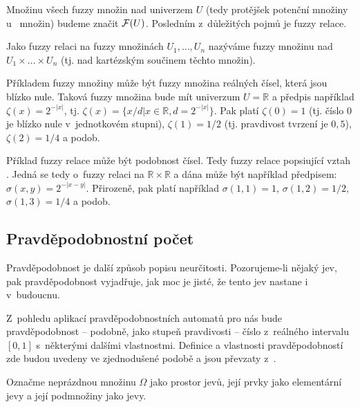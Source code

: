 Množinu všech fuzzy množin nad univerzem $U$ (tedy protějšek potenční množiny u~ množin) budeme značit $\mathcal{F}(U)$. Posledním z~důležitých pojmů je fuzzy relace.

\begin{definition}
 Jako fuzzy relaci na fuzzy množinách $U_1, \dots, U_n$ nazýváme fuzzy množinu nad $U_1 \times \dots \times U_n$ (tj. nad kartézským součinem těchto množin).
\end{definition}

\begin{example}
  Příkladem fuzzy množiny může být fuzzy množina reálných čísel, která jsou blízko nule. Taková fuzzy množina bude mít univerzum $U = \mathbb{R}$ a předpis například $\zeta(x) = 2^{-|x|}$, tj. $\zeta(x) = \{ x/d | x \in \mathbb{R}, d = 2^{-|x|} \}$. Pak platí $\zeta(0) = 1$ (tj. číslo $0$ je blízko nule v~jednotkovém stupni), $\zeta(1) = 1/2$ (tj. pravdivost tvrzení  je $0{,}5$), $\zeta(2) = 1/4$ a podob.
  
  Příklad fuzzy relace může být podobnost čísel. Tedy fuzzy relace popsiující vztah . Jedná se tedy o~fuzzy relaci na $\mathbb{R} \times \mathbb{R}$ a dána může být například předpisem: $\sigma(x, y) = 2^{-|x-y|}$. Přirozeně, pak platí například $\sigma(1, 1) = 1$, $\sigma(1, 2) = 1/2$, $\sigma(1, 3) = 1/4$ a podob.
\end{example}

\subsection{Pravděpodobnostní počet}
Pravděpodobnost je další způsob popisu neurčitosti. Pozorujeme-li nějaký jev, pak pravděpodobnost vyjadřuje, jak moc je jisté, že tento jev nastane i v~budoucnu. 

Z~pohledu aplikací pravděpodobnostních automatů pro nás bude pravděpodobnost -- podobně, jako stupeň pravdivosti -- číslo z~reálného intervalu $[0, 1]$ s~některými dalšími vlastnostmi. Definice a vlastnosti pravděpodobností zde budou uvedeny ve zjednodušené podobě a jsou převzaty z~\cite{Joh-ProbStaComSci}. 

\begin{definition}
  Označme neprázdnou množinu $\Omega$ jako prostor jevů, její prvky jako elementární jevy a její podmnožiny jako jevy.  
\end{definition}

